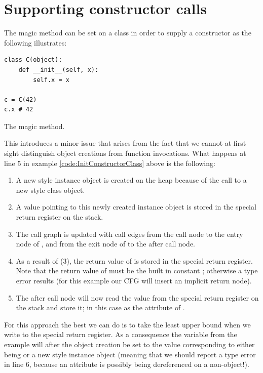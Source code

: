 \section{Supporting constructor calls}
\label{section:Supporting constructor calls}
The magic method  can be set on a class in order to supply a constructor as the following illustrates:

\begin{listing}[H]
	\begin{verbatim}
class C(object):
	def __init__(self, x):
		self.x = x

c = C(42)
c.x # 42
	\end{verbatim}
	\caption{The  magic method.}\label{code:InitConstructorClass}
\end{listing}

This introduces a minor issue that arises from the fact that we cannot at first sight distinguish object creations from function invocations. What happens at line 5 in example \ref{code:InitConstructorClass} above is the following:

\begin{enumerate}
	\item A new style instance object is created on the heap because of the call to a new style class object.
	\item A value pointing to this newly created instance object is stored in the special return register on the stack.
	\item The call graph is updated with call edges from the call node to the entry node of , and from the exit node of  to the after call node.
	\item As a result of (3), the return value of  is stored in the special return register. Note that the return value of  must be the built in constant ; otherwise a type error results (for this example our CFG will insert an implicit return  node).
	\item The after call node will now read the value from the special return register on the stack and store it; in this case as the attribute  of .
\end{enumerate}

For this approach the best we can do is to take the least upper bound when we write to the special return register. As a consequence the variable  from the example will after the object creation be set to the value corresponding to either being  or a new style instance object (meaning that we should report a type error in line 6, because an attribute is possibly being dereferenced on a non-object!).

